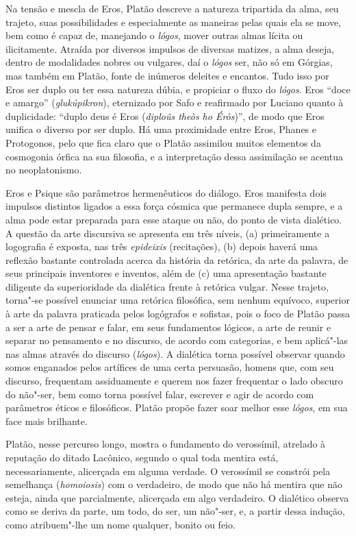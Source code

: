 Na tensão e mescla de Eros, Platão descreve a natureza tripartida da
alma, seu trajeto, suas possibilidades e especialmente as maneiras pelas
quais ela se move, bem como é capaz de, manejando o \emph{lógos}, mover
outras almas lícita ou ilicitamente. Atraída por diversos impulsos de
diversas matizes, a alma deseja, dentro de modalidades nobres ou
vulgares, daí o \emph{lógos} ser, não só em Górgias, mas também em
Platão, fonte de inúmeros deleites e encantos. Tudo isso por Eros ser
duplo ou ter essa natureza dúbia, e propiciar o fluxo do \emph{lógos}.
Eros ``doce e amargo'' (\emph{glukúpikron}), eternizado por Safo e
reafirmado por Luciano quanto à duplicidade: ``duplo deus é Eros
(\emph{diploûs theòs ho Érôs})'', de modo que Eros unifica o diverso por
ser duplo. Há uma proximidade entre Eros, Phanes e Protogonos, pelo que
fica claro que o Platão assimilou muitos elementos da cosmogonia órfica
na sua filosofia, e a interpretação dessa assimilação se acentua no
neoplatonismo.

Eros e Psique são parâmetros hermenêuticos do diálogo. Eros manifesta
dois impulsos distintos ligados a essa força cósmica que permanece dupla
sempre, e a alma pode estar preparada para esse ataque ou não, do ponto
de vista dialético. A questão da arte discursiva se apresenta em três
níveis, (a) primeiramente a logografia é exposta, nas
três \emph{epideixis }(recitações), (b) depois haverá uma reflexão
bastante controlada acerca da história da retórica, da arte da palavra,
de seus principais inventores e inventos, além de (c) uma apresentação
bastante diligente da superioridade da dialética frente à retórica
vulgar. Nesse trajeto, torna"-se possível enunciar uma retórica
filosófica, sem nenhum equívoco, superior à arte da palavra praticada
pelos logógrafos e sofistas, pois o foco de Platão passa a ser a arte de
pensar e falar, em seus fundamentos lógicos, a arte de reunir e separar
no pensamento e no discurso, de acordo com categorias, e bem aplicá"-las
nas almas através do discurso (\emph{lógos}). A dialética torna possível
observar quando somos enganados pelos artífices de uma certa persuasão,
homens que, com seu discurso, frequentam assiduamente e querem nos fazer
frequentar o lado obscuro do não"-ser, bem como torna possível falar,
escrever e agir de acordo com parâmetros éticos e filosóficos. Platão
propõe fazer soar melhor esse \emph{lógos}, em sua face mais brilhante.

Platão, nesse percurso longo, mostra o fundamento do verossímil,
atrelado à reputação do ditado Lacônico, segundo o qual toda mentira
está, necessariamente, alicerçada em alguma verdade. O verossímil se
constrói pela semelhança (\emph{homoiosis}) com o verdadeiro, de modo
que não há mentira que não esteja, ainda que parcialmente, alicerçada em
algo verdadeiro. O dialético observa como se deriva da parte, um todo, do
ser, um não"-ser, e, a partir dessa indução, como atribuem"-lhe um nome
qualquer, bonito ou feio.

